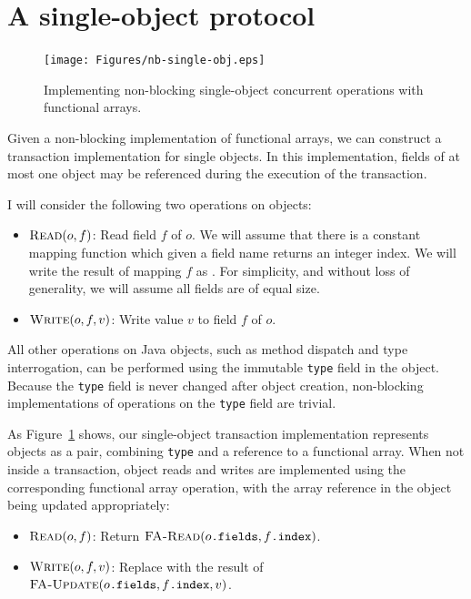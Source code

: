 \section{A single-object protocol}
\begin{figure}\centering
\texttt{[image: Figures/nb-single-obj.eps]}
\caption{Implementing non-blocking single-object concurrent operations
  with functional arrays.}
\label{fig:single-o}
\end{figure}
Given a non-blocking implementation of functional arrays, we can
construct a transaction implementation for single objects.  In
this implementation, fields of at most one object may be referenced
during the execution of the transaction.

I will consider the following two operations on objects:
\begin{itemize}
\item $\text{\sc Read}(o, f)$: Read field $f$ of $o$.  We will assume that
  there is a constant mapping function which given a field name
  returns an integer index.  We will write the result of mapping $f$
  as .  For simplicity, and without loss of generality,
  we will assume all fields are of equal size.
\item $\text{\sc Write}(o, f, v)$: Write value $v$ to field $f$ of $o$.
\end{itemize}
All other operations on Java objects, such as method dispatch and type
interrogation, can be performed using the immutable {\tt type}
field in the object.  Because the {\tt type} field is never changed
after object creation, non-blocking implementations of operations on
the {\tt type} field are trivial.

As Figure~\ref{fig:single-o} shows, our single-object transaction
implementation represents objects as a pair, combining {\tt type} and a
reference to a functional array.  When not inside a transaction,
object reads and writes are implemented using the
corresponding functional array operation, with the array reference in
the object being updated appropriately:
\begin{itemize}
\item $\text{\sc Read}(o, f)$:
  Return $\text{\sc FA-Read}(o\text{\tt .fields}, f\text{\tt .index})$.
\item $\text{\sc Write}(o, f, v)$: Replace  with the
  result of \linebreak
  $\text{\sc FA-Update}(o\text{\tt .fields}, f\text{\tt .index}, v)$.
\end{itemize}

